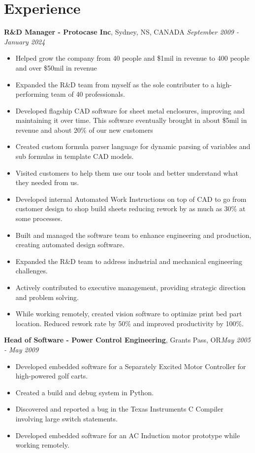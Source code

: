 \documentclass[letter,11pt]{article}
\begin{document}
\section*{Experience}
\noindent
\textbf{R\&D Manager - Protocase Inc}, Sydney, NS, CANADA \hfill \textit{September 2009 - January 2024}
\begin{itemize}[leftmargin=*,itemsep=0pt, parsep=0pt,label=$\diamond$]
\item Helped grow the company from 40 people and \$1mil in revenue to 400 people and over \$50mil in revenue
\item Expanded the R\&D team from myself as the sole contributer to a high-performing team of 40 professionals.
\item Developed flagship CAD software for sheet metal enclosures, improving and maintaining it over time. This software eventually brought in about \$5mil in revenue and about 20\% of our new customers
\item Created custom formula parser language for dynamic parsing of variables and sub formulas in template CAD models.
\item Visited customers to help them use our tools and better understand what they needed from us.
\item Developed internal Automated Work Instructions on top of CAD to go from customer design to shop build sheets reducing rework by as much as 30\% at some processes.
\item Built and managed the software team to enhance engineering and production, creating automated design software.
\item Expanded the R\&D team to address industrial and mechanical engineering challenges.
\item Actively contributed to executive management, providing strategic direction and problem solving.
\item While working remotely, created vision software to optimize print bed part location. Reduced rework rate by 50\% and improved productivity by 100\%.
\end{itemize}

\noindent
\textbf{Head of Software - Power Control Engineering}, Grants Pass, OR\hfill \textit{May 2005 - May 2009}
\begin{itemize}[leftmargin=*,itemsep=0pt, parsep=0pt,label=$\diamond$]
\item Developed embedded software for a Separately Excited Motor Controller for high-powered golf carts.
\item Created a build and debug system in Python.
\item Discovered and reported a bug in the Texas Instruments C Compiler involving large switch statements.
\item Developed embedded software for an AC Induction motor prototype while working remotely.
\end{itemize}
\end{document}
